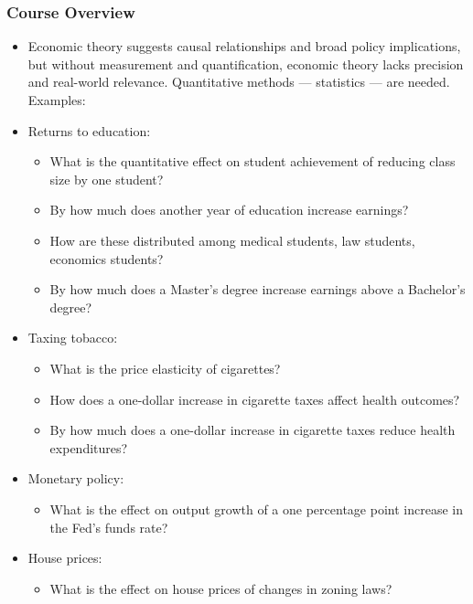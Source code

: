 

\begin{frame}
\frametitle{Course Overview}
\begin{itemize}
\item Economic theory suggests causal relationships and broad policy implications, but without measurement and quantification, economic theory lacks precision and real-world relevance. Quantitative methods --- statistics --- are needed. Examples:
\item Returns to education:
\begin{itemize}
\item What is the quantitative effect on student achievement of reducing class size by one student?
\item By how much does another year of education increase earnings?
\item How are these distributed among medical students, law students, economics students?
\item By how much does a Master's degree increase earnings above a Bachelor's degree?
\end{itemize}
\item Taxing tobacco:
\begin{itemize}
\item What is the price elasticity of cigarettes?
\item How does a one-dollar increase in cigarette taxes affect health outcomes?
\item By how much does a one-dollar increase in cigarette taxes reduce health expenditures?
\end{itemize}
\item Monetary policy:
\begin{itemize}
\item What is the effect on output growth of a one percentage point increase in the Fed's funds rate?
\end{itemize}
\item House prices:
\begin{itemize}
\item What is the effect on house prices of changes in zoning laws?
\end{itemize}
\end{itemize}
\end{frame}



